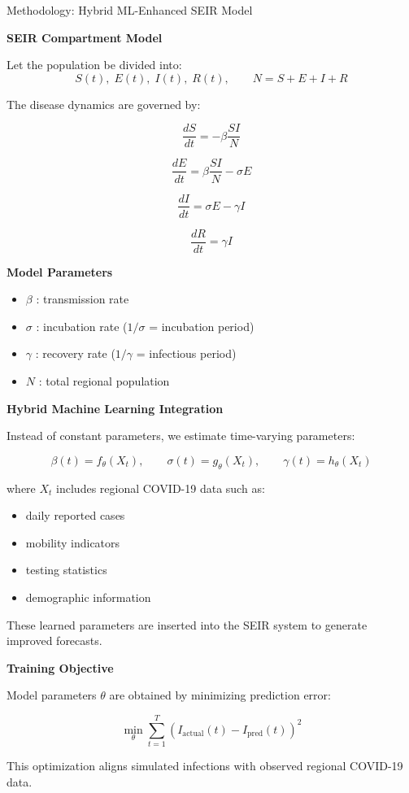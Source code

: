 \documentclass{beamer}
\begin{document}
\begin{frame}[allowframebreaks]{Methodology: Hybrid ML-Enhanced SEIR Model}

\textbf{SEIR Compartment Model}

Let the population be divided into:
\[
S(t), \; E(t), \; I(t), \; R(t), \qquad N=S+E+I+R
\]

The disease dynamics are governed by:

\[
\frac{dS}{dt} = -\beta \frac{S I}{N}
\]

\[
\frac{dE}{dt} = \beta \frac{S I}{N} - \sigma E
\]

\[
\frac{dI}{dt} = \sigma E - \gamma I
\]

\[
\frac{dR}{dt} = \gamma I
\]

\framebreak

\textbf{Model Parameters}

\begin{itemize}
\item $\beta$ : transmission rate
\item $\sigma$ : incubation rate ($1/\sigma$ = incubation period)
\item $\gamma$ : recovery rate ($1/\gamma$ = infectious period)
\item $N$ : total regional population
\end{itemize}

\framebreak

\textbf{Hybrid Machine Learning Integration}

Instead of constant parameters, we estimate time-varying parameters:

\[
\beta(t)=f_\theta(X_t), \qquad
\sigma(t)=g_\theta(X_t), \qquad
\gamma(t)=h_\theta(X_t)
\]

where $X_t$ includes regional COVID-19 data such as:

\begin{itemize}
\item daily reported cases
\item mobility indicators
\item testing statistics
\item demographic information
\end{itemize}

These learned parameters are inserted into the SEIR system to generate improved forecasts.

\framebreak

\textbf{Training Objective}

Model parameters $\theta$ are obtained by minimizing prediction error:

\[
\min_{\theta}
\sum_{t=1}^{T}
\left(I_{\text{actual}}(t)-I_{\text{pred}}(t)\right)^2
\]

This optimization aligns simulated infections with observed regional COVID-19 data.

\end{frame}
\end{document}
